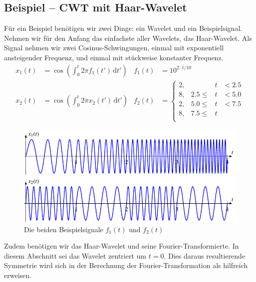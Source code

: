 \subsection{Beispiel -- CWT mit Haar-Wavelet}
Für ein Beispiel benötigen wir zwei Dinge: ein Wavelet und ein Beispielsignal.
Nehmen wir für den Anfang das einfachste aller Wavelets, das Haar-Wavelet.
Als Signal nehmen wir zwei Cosinus-Schwingungen, einmal mit exponentiell ansteigender Frequenz, und einmal mit stückweise konstanter Frequenz.
\begin{align}
    x_1(t) &= \cos\left( \int_{0}^{t} 2\pi f_1(t')\,\mathrm{d}t'\right) & f_1(t) &= 10^{2 \cdot t/10} \\
    x_2(t) &= \cos\left( \int_{0}^{t} 2\pi x_2(t')\,\mathrm{d}t'\right) & f_2(t) &= \left\lbrace \begin{matrix}
    2, & &t& < 2.5\\
    8, & 2.5 \le &t& < 5.0\\
    2, & 5.0 \le &t& < 7.5\\
    8, & 7.5 \le &t&\\
    \end{matrix}\right.
\end{align}
\begin{figure}
    \centering
	\includegraphics{papers/complex/images/signals.pdf}
    \caption{Die beiden Beispielsignale $f_1(t)$ und $f_2(t)$}
\end{figure}
Zudem benötigen wir das Haar-Wavelet und seine Fourier-Transformierte.
In diesem Abschnitt sei das Wavelet zentriert um $t=0$.
Dies daraus resultierende Symmetrie wird sich in der Berechnung der Fourier-Transformation als hilfreich erweisen.

